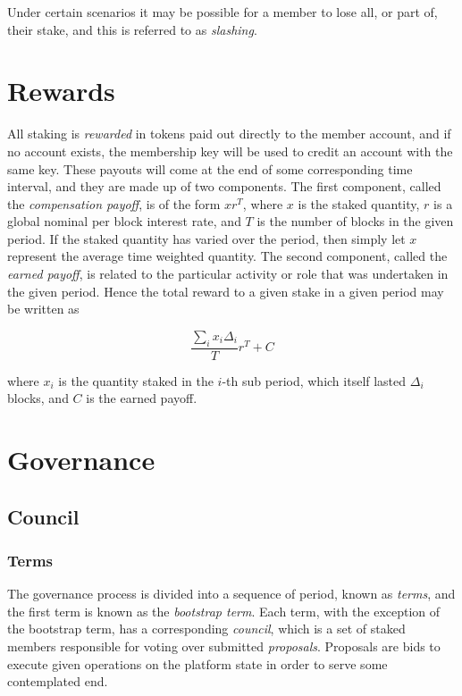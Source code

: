 \documentclass{article}
\begin{document}
Under certain scenarios it may be possible for a member to lose all, or part of, their stake, and this is referred to as \textit{slashing}.

\section{Rewards}

All staking is \textit{rewarded} in tokens paid out directly to the member account, and if no account exists, the membership key will be used to credit an account with the same key. These payouts will come at the end of some corresponding time interval, and they are made up of two components. The first component, called the \textit{compensation payoff}, is of the form $xr^{T}$, where $x$ is the staked quantity, $r$ is a global nominal per block interest rate, and $T$ is the number of blocks in the given period. If the staked quantity has varied over the period, then simply let $x$ represent the average time weighted quantity. The second component, called the \textit{earned payoff}, is related to the particular activity or role that was undertaken in the given period. Hence the total reward to a given stake in a given period may be written as

$$ \frac{\sum_i x_i\Delta_i}{T}r^T + C$$

where $x_i$ is the quantity staked in the $i$-th sub period, which itself lasted $\Delta_i$ blocks, and $C$ is the earned payoff.

\section{Governance}

\subsection{Council}

\subsubsection{Terms}

The governance process is divided into a sequence of period, known as \textit{terms}, and the first term is known as the \textit{bootstrap term}. Each term, with the exception of the bootstrap term, has a corresponding \textit{council}, which is a set of staked members responsible for voting over submitted \textit{proposals}. Proposals are bids to execute given operations on the platform state in order to serve some contemplated end.
\end{document}
